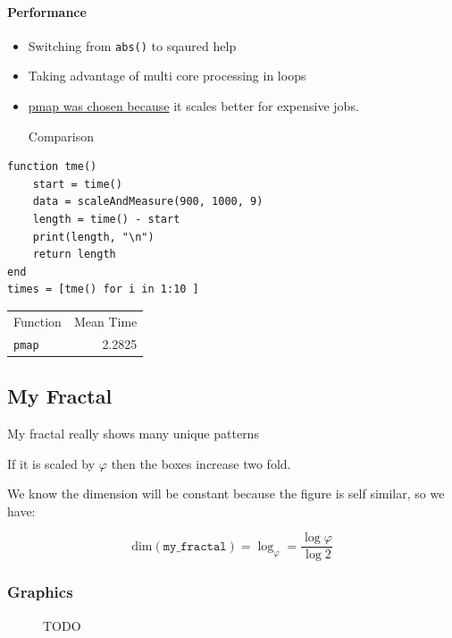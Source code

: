 \documentclass[11pt]{article}
\begin{document}
\paragraph{Performance}
\label{sec:org2e764ad}
\begin{itemize}
\item Switching from \texttt{abs()} to sqaured help
\item Taking advantage of multi core processing in loops

\item \href{https://stackoverflow.com/a/55704326/12843551}{pmap was chosen because} it scales better for expensive jobs.

Comparison
\end{itemize}
\begin{verbatim}
function tme()
    start = time()
    data = scaleAndMeasure(900, 1000, 9)
    length = time() - start
    print(length, "\n")
    return length
end
times = [tme() for i in 1:10 ]
\end{verbatim}

\begin{center}
\begin{tabular}{lr}
Function & Mean Time\\
\texttt{pmap} & 2.2825\\
\end{tabular}

\end{center}
\subsection{My Fractal}
\label{sec:org47ca93c}
My fractal really shows many unique patterns

If it is scaled by \(\varphi\) then the boxes increase two fold.

We know the dimension will be constant because the figure is self similar, so we have:

\[
\mathrm{dim} (\mathtt{my\_fractal}) = \log_{\varphi}=\frac{\log \varphi}{\log 2}
\]
\subsubsection{Graphics}
\label{sec:org3f205eb}

\begin{figure}[htbp]
\centering

\caption{\label{My-Frac-GR}TODO}
\end{figure}
\end{document}

